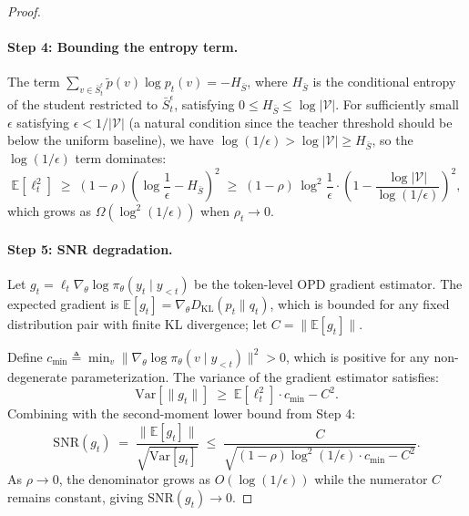 \begin{proof}
\paragraph{Step 4: Bounding the entropy term.}
The term $\sum_{v \in \bar{S}_t^\epsilon} \tilde{p}(v) \log p_t(v) = -H_{\bar{S}}$, where $H_{\bar{S}}$ is the conditional entropy of the student restricted to $\bar{S}_t^\epsilon$, satisfying $0 \le H_{\bar{S}} \le \log|\mathcal{V}|$. For sufficiently small $\epsilon$ satisfying $\epsilon < 1/|\mathcal{V}|$ (a natural condition since the teacher threshold should be below the uniform baseline), we have $\log(1/\epsilon) > \log|\mathcal{V}| \ge H_{\bar{S}}$, so the $\log(1/\epsilon)$ term dominates:
\begin{equation}
    \mathbb{E}[\ell_t^2]
    \;\ge\;
    (1-\rho)\left(\log \frac{1}{\epsilon} - H_{\bar{S}}\right)^2
    \;\ge\;
    (1-\rho)\,\log^2\!\frac{1}{\epsilon} \cdot \left(1 - \frac{\log|\mathcal{V}|}{\log(1/\epsilon)}\right)^2,
\end{equation}
which grows as $\Omega(\log^2(1/\epsilon))$ when $\rho_t \to 0$.

\paragraph{Step 5: SNR degradation.}
Let $g_t = \ell_t \nabla_\theta \log \pi_\theta(y_t \mid y_{<t})$ be the token-level OPD gradient estimator. The expected gradient is $\mathbb{E}[g_t] = \nabla_\theta D_{\mathrm{KL}}(p_t \| q_t)$, which is bounded for any fixed distribution pair with finite KL divergence; let $C = \|\mathbb{E}[g_t]\|$.

Define $c_{\min} \triangleq \min_v \|\nabla_\theta \log \pi_\theta(v \mid y_{<t})\|^2 > 0$, which is positive for any non-degenerate parameterization. The variance of the gradient estimator satisfies:
\begin{equation}
    \mathrm{Var}[\|g_t\|]
    \;\ge\;
    \mathbb{E}[\ell_t^2] \cdot c_{\min} - C^2.
\end{equation}
Combining with the second-moment lower bound from Step 4:
\begin{equation}
    \mathrm{SNR}(g_t)
    \;=\;
    \frac{\|\mathbb{E}[g_t]\|}{\sqrt{\mathrm{Var}[g_t]}}
    \;\le\;
    \frac{C}{\sqrt{(1-\rho)\log^2(1/\epsilon) \cdot c_{\min} - C^2}}.
\end{equation}
As $\rho \to 0$, the denominator grows as $O(\log(1/\epsilon))$ while the numerator $C$ remains constant, giving $\mathrm{SNR}(g_t) \to 0$.


\end{proof}
